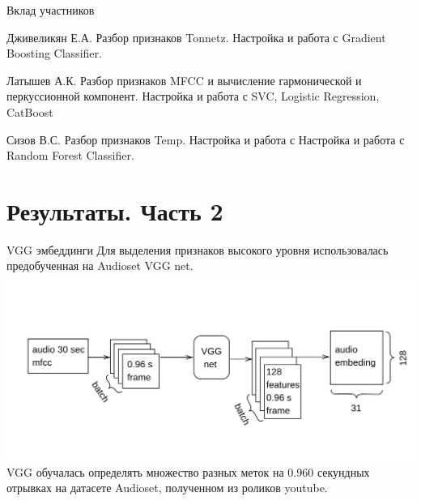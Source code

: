 \documentclass[c, aspectratio = 43]{beamer}
\begin{document}
\begin{frame}{Вклад участников}

\begin{block}{Дживеликян Е.А.}
    Разбор признаков Tonnetz.
    Настройка и работа с Gradient Boosting Classifier.
\end{block}

\begin{block}{Латышев А.К.}
    Разбор признаков MFCC и вычисление гармонической и перкуссионной компонент.
    Настройка и работа с SVC, Logistic Regression, CatBoost
\end{block}

\begin{block}{Сизов В.С.}
    Разбор признаков Temp.
    Настройка и работа с
    Настройка и работа с Random Forest Classifier.
\end{block}

\end{frame}


\section{Результаты. Часть 2}


\begin{frame}{VGG эмбеддинги}
	Для выделения признаков высокого уровня использовалась предобученная на Audioset VGG net.
	\includegraphics[width=\linewidth]{vgg_embed.png}
	VGG обучалась определять множество разных меток на 0.960 секундных отрывках на датасете Audioset, полученном из роликов youtube.
\end{frame}
\end{document}
